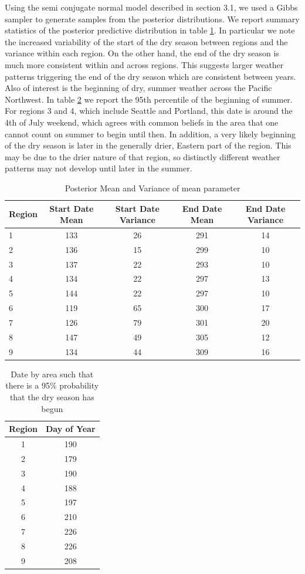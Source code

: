 \documentclass{article}
\begin{document}
Using the semi conjugate normal model described in section 3.1, we used a Gibbs sampler to generate samples from the posterior distributions.  We report summary statistics of the posterior predictive distribution in table \ref{tab:meanparams}.  In particular we note the increased variability of the start of the dry season between regions and the variance within each region.
On the other hand, the end of the dry season is much more consistent within and across regions. This suggests larger weather patterns triggering the end of the dry season which are consistent between years.  
Also of interest is the beginning of dry, summer weather across the Pacific Northwest. In table \ref{95pctsummer} we report the 95th percentile of the beginning of summer. For regions 3 and 4, which include Seattle and Portland, this date is around the 4th of July weekend, which agrees with common beliefs in the area that one cannot count on summer to begin until then. 
In addition, a very likely beginning of the dry season is later in the generally drier, Eastern part of the region. This may be due to the drier nature of that region, so distinctly different weather patterns may not develop until later in the summer. 

\begin{table}[h!]
\begin{tabular}{|l|c|c|c|c|}
\hline
Region & Start Date Mean & Start Date Variance & End Date Mean & End Date Variance\\
\hline
\hline
1&133&26&291&14\\
2&136&15&299&10\\
3&137&22&293&10\\
4&134&22&297&13\\
5&144&22&297&10\\
6&119&65&300&17\\
7&126&79&301&20\\
8&147&49&305&12\\
9&134&44&309&16\\
\hline
\end{tabular}
\caption{Posterior Mean and Variance of mean parameter}
\label{tab:meanparams}
\end{table}

\begin{table}[h!]
\begin{tabular}{|c|c|}
\hline
Region & Day of Year \\
\hline
\hline
1&190 \\
2&179 \\
3&190 \\
4&188 \\
5&197 \\
6&210\\
 7&226 \\
 8&226 \\
 9&208\\
\hline
\end{tabular}
\caption{Date by area such that there is a 95\% probability that the dry season has begun}
\label{95pctsummer}
\end{table}
\end{document}
